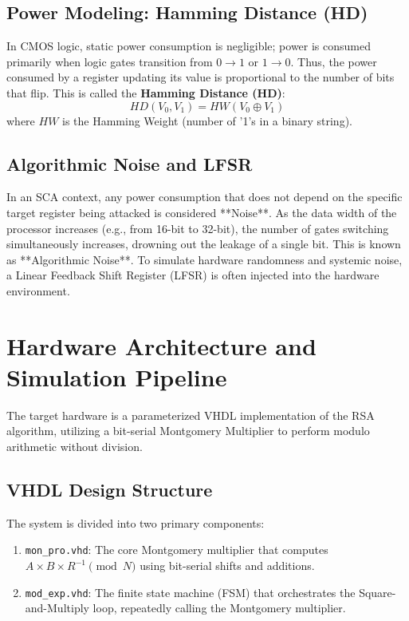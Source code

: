 \documentclass[conference, a4paper]{IEEEtran}
\begin{document}
\subsection{Power Modeling: Hamming Distance (HD)}
In CMOS logic, static power consumption is negligible; power is consumed primarily when logic gates transition from $0 \rightarrow 1$ or $1 \rightarrow 0$. Thus, the power consumed by a register updating its value is proportional to the number of bits that flip. This is called the \textbf{Hamming Distance (HD)}:
\begin{equation}
HD(V_0, V_1) = HW(V_0 \oplus V_1)
\end{equation}
where $HW$ is the Hamming Weight (number of '1's in a binary string).

\subsection{Algorithmic Noise and LFSR}
In an SCA context, any power consumption that does not depend on the specific target register being attacked is considered **Noise**. As the data width of the processor increases (e.g., from 16-bit to 32-bit), the number of gates switching simultaneously increases, drowning out the leakage of a single bit. This is known as **Algorithmic Noise**. To simulate hardware randomness and systemic noise, a Linear Feedback Shift Register (LFSR) is often injected into the hardware environment.

\section{Hardware Architecture and Simulation Pipeline}

The target hardware is a parameterized VHDL implementation of the RSA algorithm, utilizing a bit-serial Montgomery Multiplier to perform modulo arithmetic without division.

\subsection{VHDL Design Structure}
The system is divided into two primary components:
\begin{enumerate}
    \item \texttt{mon\_pro.vhd}: The core Montgomery multiplier that computes $A \times B \times R^{-1} \pmod N$ using bit-serial shifts and additions.
    \item \texttt{mod\_exp.vhd}: The finite state machine (FSM) that orchestrates the Square-and-Multiply loop, repeatedly calling the Montgomery multiplier.
\end{enumerate}
\end{document}
